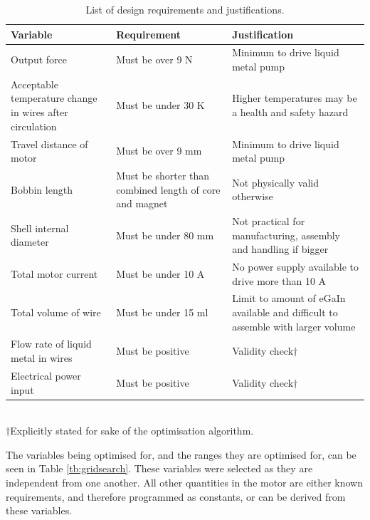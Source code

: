 \documentclass[a4paper,12pt]{article}
\begin{document}
\begin{table} [h!]
    \centering
    \caption{List of design requirements and justifications.}
    \label{tb:optrequirements}
    \begin{tabular}{M | M | M}
        \hline
        \textbf{Variable} & \textbf{Requirement} & \textbf{Justification} \\
        \hline\hline
        Output force & Must be over 9 N & Minimum to drive liquid metal pump \\
        \hline
        Acceptable temperature change in wires after circulation & Must be under 30 K & Higher temperatures may be a health and safety hazard \\
        \hline
        Travel distance of motor & Must be over 9 mm & Minimum to drive liquid metal pump \\
        \hline
        Bobbin length & Must be shorter than combined length of core and magnet & Not physically valid otherwise \\
        \hline
        Shell internal diameter & Must be under 80 mm & Not practical for manufacturing, assembly and handling if bigger \\
        \hline
        Total motor current & Must be under 10 A & No power supply available to drive more than 10 A \\
        \hline
        Total volume of wire & Must be under 15 ml & Limit to amount of eGaIn available and difficult to assemble with larger volume \\
        \hline
        Flow rate of liquid metal in wires & Must be positive & Validity check$\dagger$ \\
        \hline
        Electrical power input & Must be positive & Validity check$\dagger$ \\
        \hline
    \end{tabular}
    \\$\dagger$Explicitly stated for sake of the optimisation algorithm.
\end{table}

The variables being optimised for, and the ranges they are optimised for, can be seen in Table \ref{tb:gridsearch}. These variables were selected as they are independent from one another. All other quantities in the motor are either known requirements, and therefore programmed as constants, or can be derived from these variables.
\end{document}

